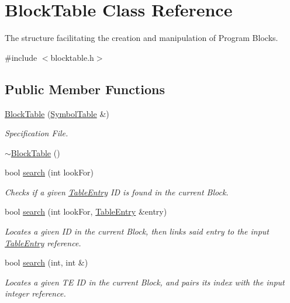 \hypertarget{classBlockTable}{
\section{BlockTable Class Reference}
\label{classBlockTable}
}


The structure facilitating the creation and manipulation of Program Blocks.  




{\ttfamily \#include $<$blocktable.h$>$}

\subsection*{Public Member Functions}
\begin{DoxyCompactItemize}
\item 
\hyperlink{classBlockTable_ab9659ed0c4fbbc10e919da0739c49e7e}{BlockTable} (\hyperlink{classSymbolTable}{SymbolTable} \&)
\begin{DoxyCompactList}\small\item\em Specification File. \item\end{DoxyCompactList}\item 
\hyperlink{classBlockTable_a5a78c20a967eb659c9f424687fe17c1d}{$\sim$BlockTable} ()
\item 
bool \hyperlink{classBlockTable_aa34f1de4dcf9db81aa420d2a9aca3a7c}{search} (int lookFor)
\begin{DoxyCompactList}\small\item\em Checks if a given \hyperlink{structTableEntry}{TableEntry} ID is found in the current Block. \item\end{DoxyCompactList}\item 
bool \hyperlink{classBlockTable_aab6bf14513041f3d29a15f9ebd7a053e}{search} (int lookFor, \hyperlink{structTableEntry}{TableEntry} \&entry)
\begin{DoxyCompactList}\small\item\em Locates a given ID in the current Block, then links said entry to the input \hyperlink{structTableEntry}{TableEntry} reference. \item\end{DoxyCompactList}\item 
bool \hyperlink{classBlockTable_a72860f8f2ba53404cdf4fdbaf9d5f85e}{search} (int, int \&)
\begin{DoxyCompactList}\small\item\em Locates a given TE ID in the current Block, and pairs its index with the input integer reference. \item\end{DoxyCompactList}\item 

\end{DoxyCompactItemize}
